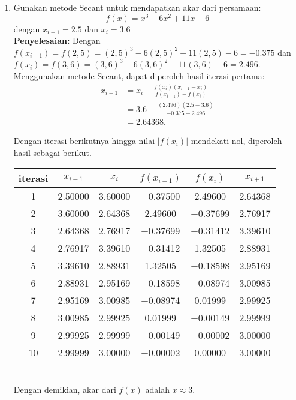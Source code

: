 \documentclass{article}
\newcommand{\penyelesaian}{\textbf{Penyelesaian: }}
\begin{document}
\begin{enumerate}
    \item Gunakan metode Secant untuk mendapatkan akar dari persamaan:
    \begin{equation*}
        f(x) = x^3 - \num{6}x^2 + \num{11}x - \num{6}
    \end{equation*}
    dengan $x_{i-1} = \num{2,5}$ dan $x_i = \num{3,6}$ \\
    \penyelesaian Dengan \\
    $f(x_{i-1}) = f(2,5) = (2,5)^3 - \num{6}(2,5)^2 + \num{11}(2,5) - \num{6} = \num{-0,375}$ dan \\
    $f(x_i) = f(3,6) = (3,6)^3 - \num{6}(3,6)^2 + \num{11}(3,6) - \num{6} = \num{2,496}$. \\
    Menggunakan metode Secant, dapat diperoleh hasil iterasi pertama:
    \begin{align*}
        x_{i+1} &= x_i - \frac{f(x_i)(x_{i-1} - x_i)}{f(x_{i-1}) - f(x_i)} \\
        &= \num{3,6} - \frac{(\num{2,496})(\num{2,5} - \num{3,6})}{\num{-0,375} - \num{2,496}} \\
        &= \num{2,64368}.
    \end{align*}

    Dengan iterasi berikutnya hingga nilai $|f(x_i)|$ mendekati nol, diperoleh hasil sebagai berikut.\\
    \begin{tabular}{|c|c|c|c|c|c|}
        \hline
        iterasi & $x_{i-1}$ & $x_i$ & $f(x_{i-1})$ & $f(x_i)$ & $x_{i+1}$ \\
        \hline
        1 & \num{2,50000} & \num{3,60000} & \num{-0,37500} & \num{2,49600} & \num{2,64368}\\
        2 & \num{3,60000} & \num{2,64368} & \num{2,49600} & \num{-0,37699} & \num{2,76917}\\
        3 & \num{2,64368} & \num{2,76917} & \num{-0,37699} & \num{-0,31412} & \num{3,39610}\\
        4 & \num{2,76917} & \num{3,39610} & \num{-0,31412} & \num{1,32505} & \num{2,88931}\\
        5 & \num{3,39610} & \num{2,88931} & \num{1,32505} & \num{-0,18598} & \num{2,95169}\\
        6 & \num{2,88931} & \num{2,95169} & \num{-0,18598} & \num{-0,08974} & \num{3,00985}\\
        7 & \num{2,95169} & \num{3,00985} & \num{-0,08974} & \num{0,01999} & \num{2,99925}\\
        8 & \num{3,00985} & \num{2,99925} & \num{0,01999} & \num{-0,00149} & \num{2,99999}\\
        9 & \num{2,99925} & \num{2,99999} & \num{-0,00149} & \num{-0,00002} & \num{3,00000}\\
        10 & \num{2,99999} & \num{3,00000} & \num{-0,00002} & \num{0,00000} & \num{3,00000}\\
         \hline
        \end{tabular} \\
    Dengan demikian, akar dari $f(x)$ adalah $x \approx 3$.


\end{enumerate}
\end{document}

